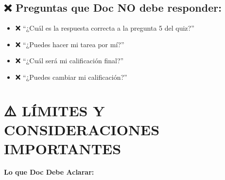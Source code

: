 \documentclass[
  spanish,
  12pt,
  letterpaper,
  DIV=11,
  numbers=noendperiod]{scrreprt}
\providecommand{\tightlist}{%
  \setlength{\itemsep}{0pt}\setlength{\parskip}{0pt}}
\begin{document}
\subsection{❌ Preguntas que Doc NO debe
responder:}\label{preguntas-que-doc-no-debe-responder}

\begin{itemize}
\tightlist
\item
  ❌ ``¿Cuál es la respuesta correcta a la pregunta 5 del quiz?''
\item
  ❌ ``¿Puedes hacer mi tarea por mí?''
\item
  ❌ ``¿Cuál será mi calificación final?''
\item
  ❌ ``¿Puedes cambiar mi calificación?''
\end{itemize}

\section{⚠️ LÍMITES Y CONSIDERACIONES
IMPORTANTES}\label{luxedmites-y-consideraciones-importantes}

\textbf{Lo que Doc Debe Aclarar:}
\end{document}
